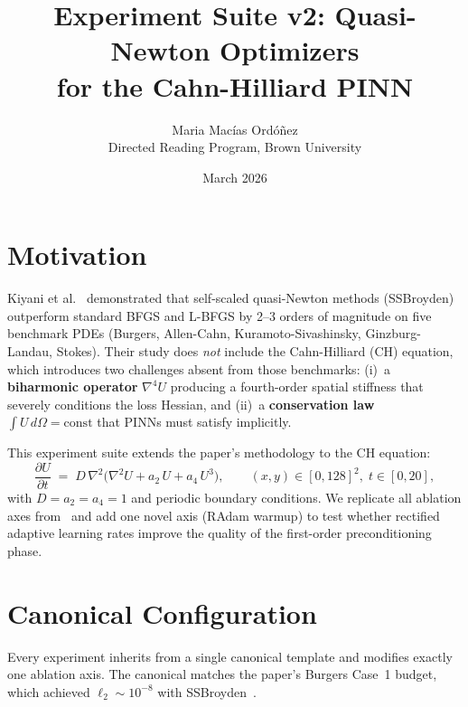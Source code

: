 \documentclass[11pt,a4paper]{article}
\title{\vspace{-1.5cm}\textbf{Experiment Suite v2: Quasi-Newton Optimizers\\for the Cahn-Hilliard PINN}\vspace{-0.3cm}}
\author{Maria Macías Ordóñez \\ \small Directed Reading Program, Brown University}
\date{March 2026}
\begin{document}
\maketitle
\thispagestyle{fancy}

\section{Motivation}

Kiyani et al.~\cite{kiyani2025} demonstrated that self-scaled quasi-Newton methods (SSBroyden) outperform standard BFGS and L-BFGS by 2--3 orders of magnitude on five benchmark PDEs (Burgers, Allen-Cahn, Kuramoto-Sivashinsky, Ginzburg-Landau, Stokes).
Their study does \emph{not} include the Cahn-Hilliard (CH) equation, which introduces two challenges absent from those benchmarks: (i)~a \textbf{biharmonic operator} $\nabla^4 U$ producing a fourth-order spatial stiffness that severely conditions the loss Hessian, and (ii)~a \textbf{conservation law} $\int U\,d\Omega = \text{const}$ that PINNs must satisfy implicitly.

This experiment suite extends the paper's methodology to the CH equation:
\begin{equation}
    \frac{\partial U}{\partial t} \;=\; D\,\nabla^2\!\bigl(\nabla^2 U + a_2\,U + a_4\,U^3\bigr),
    \qquad (x,y)\in[0,128]^2,\; t\in[0,20],
    \label{eq:ch}
\end{equation}
with $D=a_2=a_4=1$ and periodic boundary conditions.
We replicate all ablation axes from~\cite{kiyani2025} and add one novel axis (RAdam warmup) to test whether rectified adaptive learning rates improve the quality of the first-order preconditioning phase.

\section{Canonical Configuration}

Every experiment inherits from a single canonical template and modifies exactly one ablation axis.
The canonical matches the paper's Burgers Case~1 budget, which achieved $\ell_2 \sim 10^{-8}$ with SSBroyden~\cite[Table~2]{kiyani2025}.
\end{document}
